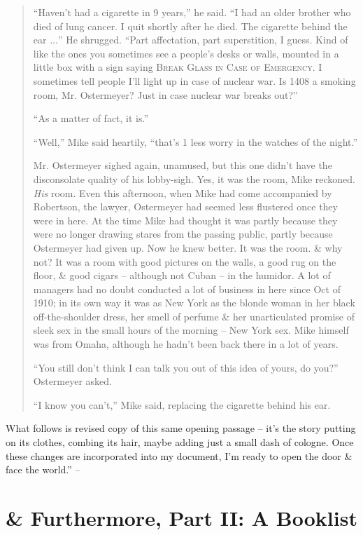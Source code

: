 \documentclass{article}
\numberwithin{equation}{section}
\begin{document}
\begin{quotation}
	``Haven't had a cigarette in 9 years,'' he said. ``I had an older brother who died of lung cancer. I quit shortly after he died. The cigarette behind the ear $\ldots$'' He shrugged. ``Part affectation, part superstition, I guess. Kind of like the ones you sometimes see a people's desks or walls, mounted in a little box with a sign saying \textsc{Break Glass in Case of Emergency}. I sometimes tell people I'll light up in case of nuclear war. Is 1408 a smoking room, Mr. Ostermeyer? Just in case nuclear war breaks out?''
	
	``As a matter of fact, it is.''
	
	``Well,'' Mike said heartily, ``that's 1 less worry in the watches of the night.''
	
	Mr. Ostermeyer sighed again, unamused, but this one didn't have the disconsolate quality of his lobby-sigh. Yes, it was the room, Mike reckoned. \textit{His} room. Even this afternoon, when Mike had come accompanied by Robertson, the lawyer, Ostermeyer had seemed less flustered once they were in here. At the time Mike had thought it was partly because they were no longer drawing stares from the passing public, partly because Ostermeyer had given up. Now he knew better. It was the room. \& why not? It was a room with good pictures on the walls, a good rug on the floor, \& good cigars -- although not Cuban -- in the humidor. A lot of managers had no doubt conducted a lot of business in here since Oct of 1910; in its own way it was as New York as the blonde woman in her black off-the-shoulder dress, her smell of perfume \& her unarticulated promise of sleek sex in the small hours of the morning -- New York sex. Mike himself was from Omaha, although he hadn't been back there in a lot of years.
	
	``You still don't think I can talk you out of this idea of yours, do you?'' Ostermeyer asked.
	
	``I know you can't,'' Mike said, replacing the cigarette behind his ear.
\end{quotation}
What follows is revised copy of this same opening passage -- it's the story putting on its clothes, combing its hair, maybe adding just a small dash of cologne. Once these changes are incorporated into my document, I'm ready to open the door \& face the world.'' -- \cite[pp. 218--221]{King2010}


\section{\& Furthermore, Part II: A Booklist}
\end{document}
